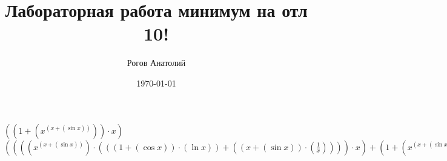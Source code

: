 \documentclass[12pt, letterpaper]{article}
\title{Лабораторная работа минимум на отл 10!}
\author{Рогов Анатолий}
\date{\today}
\begin{document}
\maketitle
\newpage
$({({1}+{({x}^{({x}+{(\sin{x})})})})}\cdot{x})$\\
$({({({({x}^{({x}+{(\sin{x})})})}\cdot{({({({1}+{(\cos{x})})}\cdot{(\ln{x})})}+{({({x}+{(\sin{x})})}\cdot{(\frac{1}{x})})})})}\cdot{x})}+{({1}+{({x}^{({x}+{(\sin{x})})})})})$\\
\end{document}
